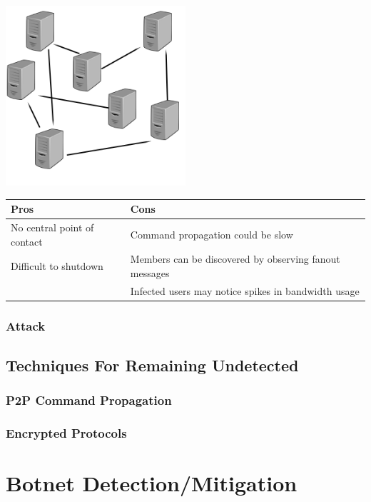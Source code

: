 \begin{center}
  \includegraphics[width=0.5\textwidth]{assets/p2ptopo.png}
  \label{fig:p2p_topo_fig}
\end{center}

\begin{tabular}{p{8cm} | p{8cm}}
  \textbf{Pros} & \textbf{Cons} \\ \hline
  \textbullet{}No central point of contact & \textbullet{}Command propagation could be slow \\
  \textbullet{}Difficult to shutdown       & \textbullet{}Members can be discovered by observing fanout messages\\
                                           & \textbullet{}Infected users may notice spikes in bandwidth usage\\
\end{tabular}

\subsubsection{Attack}

\subsection{Techniques For Remaining Undetected}
\subsubsection{P2P Command Propagation}
\subsubsection{Encrypted Protocols}

\section{Botnet Detection/Mitigation}

